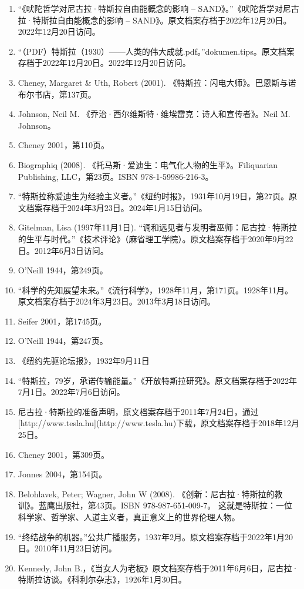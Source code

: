 \begin{enumerate}
\item “《吠陀哲学对尼古拉·特斯拉自由能概念的影响 – SAND》。”《吠陀哲学对尼古拉·特斯拉自由能概念的影响 – SAND》。原文档案存档于2022年12月20日。2022年12月20日访问。
\item “（PDF）特斯拉（1930）——人类的伟大成就.pdf。”dokumen.tips。原文档案存档于2022年12月20日。2022年12月20日访问。
\item Cheney, Margaret & Uth, Robert (2001). 《特斯拉：闪电大师》。巴恩斯与诺布尔书店，第137页。
\item Johnson, Neil M. 《乔治·西尔维斯特·维埃雷克：诗人和宣传者》。Neil M. Johnson。
\item Cheney 2001，第110页。
\item Biographiq (2008). 《托马斯·爱迪生：电气化人物的生平》。Filiquarian Publishing, LLC，第23页。ISBN 978-1-59986-216-3。
\item “特斯拉称爱迪生为经验主义者。”《纽约时报》，1931年10月19日，第27页。原文档案存档于2024年3月23日。2024年1月15日访问。
\item Gitelman, Lisa (1997年11月1日). “调和远见者与发明者巫师：尼古拉·特斯拉的生平与时代。”《技术评论》（麻省理工学院）。原文档案存档于2020年9月22日。2012年6月3日访问。
\item O'Neill 1944，第249页。
\item “科学的先知展望未来。”《流行科学》，1928年11月，第171页。1928年11月。原文档案存档于2024年3月23日。2013年3月18日访问。
\item Seifer 2001，第1745页。
\item O'Neill 1944，第247页。  
\item 《纽约先驱论坛报》，1932年9月11日  
\item “特斯拉，79岁，承诺传输能量。”《开放特斯拉研究》。原文档案存档于2022年7月1日。2022年7月6日访问。  
\item 尼古拉·特斯拉的准备声明，原文档案存档于2011年7月24日，通过[http://www.tesla.hu](http://www.tesla.hu)下载，原文档案存档于2018年12月25日。  
\item Cheney 2001，第309页。  
\item Jonnes 2004，第154页。  
\item Belohlavek, Peter; Wagner, John W (2008). 《创新：尼古拉·特斯拉的教训》。蓝鹰出版社，第43页。ISBN 978-987-651-009-7。 这就是特斯拉：一位科学家、哲学家、人道主义者，真正意义上的世界伦理人物。  
\item “终结战争的机器。”公共广播服务，1937年2月。原文档案存档于2022年1月20日。2010年11月23日访问。
\item Kennedy, John B.，《当女人为老板》原文档案存档于2011年6月6日，尼古拉·特斯拉访谈。《科利尔杂志》，1926年1月30日。  

\end{enumerate}
